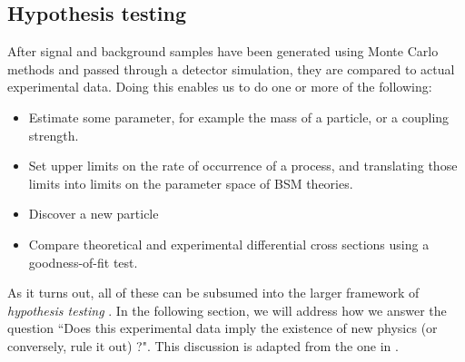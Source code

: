 \subsection{Hypothesis testing}
After signal and background samples have been generated using Monte Carlo methods and passed through a detector simulation, they are compared to actual experimental data. Doing this enables us to do one or more of the following:
\begin{itemize}
  \item Estimate some parameter, for example the mass of a particle, or a coupling strength.
  \item Set upper limits on the rate of occurrence of a process, and translating those limits into limits on the parameter space of BSM theories.
  \item Discover a new particle
  \item Compare theoretical and experimental differential cross sections using a goodness-of-fit test.
\end{itemize}
As it turns out, all of these can be subsumed into the larger framework of \emph{hypothesis testing} \citep{Heinrich:2002}. 
In the following section, we will address how we answer the question ``Does this experimental data imply the existence of new physics (or conversely, rule it out) ?". This discussion is adapted from the one in \citep{Cranmer:2015nia}. 

